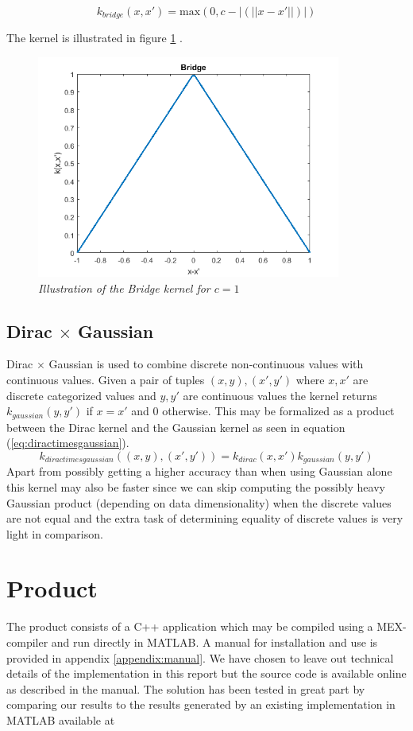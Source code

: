 \documentclass{article}
\begin{document}
\begin{equation}
\label{eq:bridge}
k_{bridge}(x, x') = \text{max}(0, c - |(||x - x'||)|)
\end{equation}

The kernel is illustrated in figure \ref{fig:bridge_graph} .

\begin{figure}[H]
	\centering
	\includegraphics[width=10cm]{bridge}
	\caption{\textit{Illustration of the Bridge kernel for $c=1$}}
	\label{fig:bridge_graph}
\end{figure}

\subsection{Dirac $\times$ Gaussian}
Dirac $\times$ Gaussian is used to combine discrete non-continuous values with continuous values. Given a pair of tuples $(x,y),(x',y')$ where $x,x'$ are discrete categorized values and $y,y'$ are continuous values the kernel returns $k_{gaussian}(y,y')$ if $x=x'$ and 0 otherwise. This may be formalized as a product between the Dirac kernel and the Gaussian kernel as seen in equation (\ref{eq:diractimesgaussian}).
\begin{equation}
\label{eq:diractimesgaussian}
k_{diractimesgaussian}((x,y), (x',y')) = k_{dirac}(x, x') k_{gaussian}(y, y')
\end{equation}
Apart from possibly getting a higher accuracy than when using Gaussian alone this kernel may also be faster since we can skip computing the possibly heavy Gaussian product (depending on data dimensionality) when the discrete values are not equal and the extra task of determining equality of discrete values is very light in comparison.

\section{Product}
The product consists of a C++ application which may be compiled using a MEX-compiler and run directly in MATLAB. A manual for installation and use is provided in appendix \ref{appendix:manual}. We have chosen to leave out technical details of the implementation in this report but the source code is available online as described in the manual. The solution has been tested in great part by comparing our results to the results generated by an existing implementation in MATLAB available at
\end{document}
